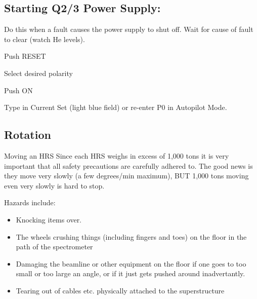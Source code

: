 {\subsection{Starting Q2/3 Power Supply:}

 Do this when a fault causes the power supply to shut off.
 Wait for cause of fault to clear (watch He levels). 
 \begin{list}{.~}{\setlength{\itemsep}{-0.15cm}}
   \item Push RESET 
   \item Select desired polarity
   \item Push ON
   \item Type in Current Set (light blue field) or re-enter P0 in Autopilot Mode.
\end{list}

} %

\subsection{Rotation}
%
%
Moving an HRS
Since each HRS weighs in excess of 1,000 tons it is very important that all safety
precautions are carefully adhered to. The good news is they move very slowly (a few degrees/min
maximum), BUT 1,000 tons moving even very slowly is hard to stop. 

Hazards include:
\begin{itemize}
\item{Knocking items over.}
\item{The wheels crushing things (including fingers and toes) on the floor in the path of the 
spectrometer}
\item{Damaging the beamline or other equipment on the floor if one goes to too small 
or too large an angle, or if it just gets pushed around inadvertantly.}
\item{Tearing out of cables etc. physically attached to the superstructure}
\end{itemize}

